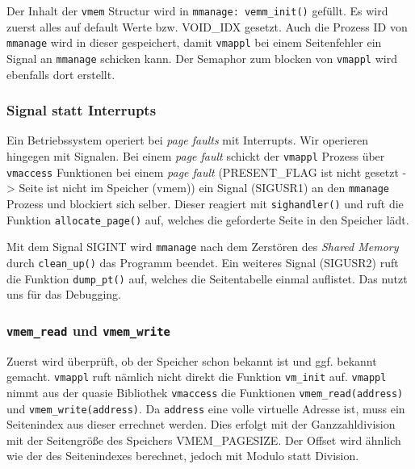 \documentclass[
   draft=false
  ,paper=a4
  ,twoside=false
  ,fontsize=11pt
  ,headsepline
  ,BCOR10mm
  ,DIV11
  ,parskip=full+
]{scrartcl} %
\begin{document}
        Der Inhalt der \texttt{vmem} Structur wird in 
        \texttt{mmanage: vemm\_init()} gefüllt. Es wird zuerst alles auf 
        default Werte bzw. VOID\_IDX gesetzt. Auch die Prozess ID von 
        \texttt{mmanage} wird in dieser gespeichert, damit \texttt{vmappl} bei 
        einem Seitenfehler ein Signal an \texttt{mmanage} schicken kann.
        Der Semaphor zum blocken von \texttt{vmappl} wird ebenfalls dort 
        erstellt.

        \subsubsection{Signal statt Interrupts}
        Ein Betriebssystem operiert bei \textit{page faults} mit Interrupts. Wir
        operieren hingegen mit Signalen. Bei einem \textit{page fault} schickt
        der \texttt{vmappl} Prozess über \texttt{vmaccess} Funktionen bei einem
        \textit{page fault} (PRESENT\_FLAG ist nicht gesetzt -> Seite ist nicht
        im Speicher (vmem)) ein Signal (SIGUSR1) an den \texttt{mmanage} Prozess und 
        blockiert sich selber.  
        Dieser reagiert mit \texttt{sighandler()} und ruft die Funktion
        \texttt{allocate\_page()} auf, welches die geforderte Seite in den 
        Speicher lädt.

        Mit dem Signal SIGINT wird \texttt{mmanage} nach dem Zerstören des
        \textit{Shared Memory} durch \texttt{clean\_up()} das Programm beendet.
        Ein weiteres Signal (SIGUSR2) ruft die Funktion \texttt{dump\_pt()}
        auf, welches die Seitentabelle einmal auflistet. Das nutzt uns für das
        Debugging. 
        
        \subsubsection{\texttt{vmem\_read} und \texttt{vmem\_write}}
        Zuerst wird überprüft, ob der Speicher schon bekannt ist und ggf.
        bekannt gemacht. \texttt{vmappl} ruft nämlich nicht direkt
        die Funktion \texttt{vm\_init} auf.
        \texttt{vmappl} nimmt aus der quasie Bibliothek \texttt{vmaccess} die 
        Funktionen \texttt{vmem\_read(address)} und \texttt{vmem\_write(address)}.
        Da \texttt{address} eine volle virtuelle Adresse ist, muss ein 
        Seitenindex aus dieser errechnet werden. Dies erfolgt mit der 
        Ganzzahldivision mit der Seitengröße des Speichers VMEM\_PAGESIZE.
        Der Offset wird ähnlich wie der des Seitenindexes berechnet, jedoch mit
        Modulo statt Division.
\end{document}
